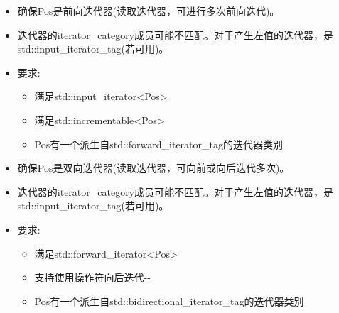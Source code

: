 
\begin{itemize}
\item
确保Pos是前向迭代器(读取迭代器，可进行多次前向迭代)。

\item
迭代器的iterator\_category成员可能不匹配。对于产生左值的迭代器，是std::input\_iterator\_tag(若可用)。

\item
要求:
\begin{itemize}
\item
满足std::input\_iterator<Pos>

\item
满足std::incrementable<Pos>

\item
Pos有一个派生自std::forward\_iterator\_tag的迭代器类别
\end{itemize}
\end{itemize}


\begin{itemize}
\item
确保Pos是双向迭代器(读取迭代器，可向前或向后迭代多次)。

\item
迭代器的iterator\_category成员可能不匹配。对于产生左值的迭代器，是std::input\_iterator\_tag(若可用)。

\item
要求:
\begin{itemize}
\item
满足std::forward\_iterator<Pos>

\item
支持使用操作符向后迭代-{}-

\item
Pos有一个派生自std::bidirectional\_iterator\_tag的迭代器类别
\end{itemize}
\end{itemize}


